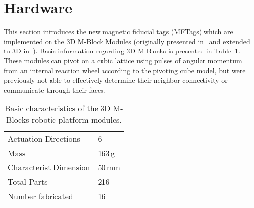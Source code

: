 \section{Hardware}
\label{sec:Hardware}

This section introduces the new magnetic fiducial tags (MFTags) which are implemented on the 3D M-Block Modules (originally presented in~\cite{RomanishinRus-IROS13} and extended to 3D in~\cite{Romanishin20153d}). Basic information regarding 3D M-Blocks is presented in Table~\ref{tab:hardwareOverviewTable}. These modules can pivot on a cubic lattice using pulses of angular momentum from an internal reaction wheel according to the pivoting cube model, but were previously not able to effectively determine their neighbor connectivity or communicate through their faces. 
\begin{table}[h]
	\caption{Basic characteristics of the 3D M-Blocks robotic platform modules.}
	\centering
	\begin{tabular}{ p{3.5cm}  p{2cm} }
		\hline
		Actuation Directions & 6 \\
		Mass  & 163\,g \\
		Characterist Dimension & 50\,mm \\
		Total Parts  & 216 \\
		Number fabricated  & 16 \\
	\end{tabular}
	\label{tab:hardwareOverviewTable}
\end{table}

